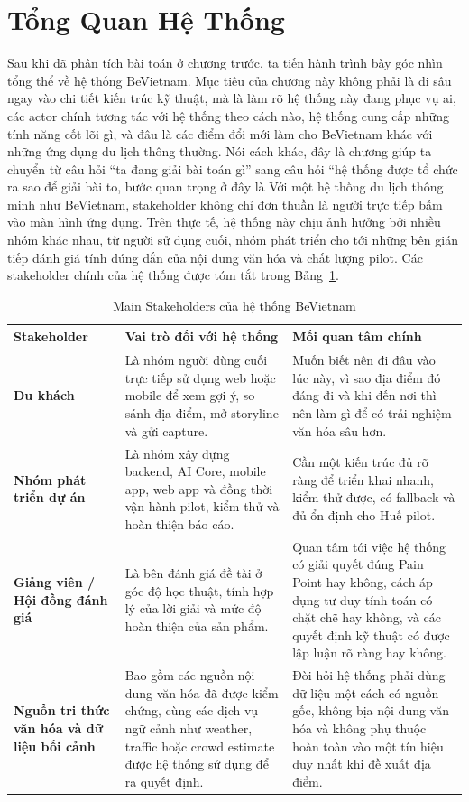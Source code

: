 \section{Tổng Quan Hệ Thống}

Sau khi đã phân tích bài toán ở
chương trước, ta tiến hành trình bày góc nhìn tổng thể về hệ thống
BeVietnam. Mục tiêu của chương này không phải là đi sâu ngay vào chi tiết
kiến trúc kỹ thuật, mà là làm rõ hệ thống này đang phục vụ ai, các actor
chính tương tác với hệ thống theo cách nào, hệ thống cung cấp những tính
năng cốt lõi gì, và đâu là các điểm đổi mới làm cho BeVietnam khác với
những ứng dụng du lịch thông thường. Nói cách khác, đây là chương giúp
ta chuyển từ câu hỏi ``ta đang giải bài toán gì'' sang câu hỏi ``hệ thống
được tổ chức ra sao để giải bài to, bước quan trọng ở đây là 
Với một hệ thống du lịch thông minh như BeVietnam, stakeholder không chỉ
đơn thuần là người trực tiếp bấm vào màn hình ứng dụng. Trên thực tế, hệ
thống này chịu ảnh hưởng bởi nhiều nhóm khác nhau, từ người sử dụng cuối,
nhóm phát triển cho tới những bên gián tiếp đánh giá tính đúng đắn của
nội dung văn hóa và chất lượng pilot. Các stakeholder chính của hệ thống
được tóm tắt trong Bảng~\ref{tab:main_stakeholders}.

\begin{table}[H]
\centering
\caption{Main Stakeholders của hệ thống BeVietnam}
\label{tab:main_stakeholders}
\begin{tabularx}{\textwidth}{>{\raggedright\arraybackslash}p{3.1cm} X X}
\toprule
\textbf{Stakeholder} & \textbf{Vai trò đối với hệ thống} & \textbf{Mối quan tâm chính} \\
\midrule
\textbf{Du khách} & Là nhóm người dùng cuối trực tiếp sử dụng web hoặc mobile để xem gợi ý, so sánh địa điểm, mở storyline và gửi capture. & Muốn biết nên đi đâu vào lúc này, vì sao địa điểm đó đáng đi và khi đến nơi thì nên làm gì để có trải nghiệm văn hóa sâu hơn. \\
\textbf{Nhóm phát triển dự án} & Là nhóm xây dựng backend, AI Core, mobile app, web app và đồng thời vận hành pilot, kiểm thử và hoàn thiện báo cáo. & Cần một kiến trúc đủ rõ ràng để triển khai nhanh, kiểm thử được, có fallback và đủ ổn định cho Huế pilot. \\
\textbf{Giảng viên / Hội đồng đánh giá} & Là bên đánh giá đề tài ở góc độ học thuật, tính hợp lý của lời giải và mức độ hoàn thiện của sản phẩm. & Quan tâm tới việc hệ thống có giải quyết đúng Pain Point hay không, cách áp dụng tư duy tính toán có chặt chẽ hay không, và các quyết định kỹ thuật có được lập luận rõ ràng hay không. \\
\textbf{Nguồn tri thức văn hóa và dữ liệu bối cảnh} & Bao gồm các nguồn nội dung văn hóa đã được kiểm chứng, cùng các dịch vụ ngữ cảnh như weather, traffic hoặc crowd estimate được hệ thống sử dụng để ra quyết định. & Đòi hỏi hệ thống phải dùng dữ liệu một cách có nguồn gốc, không bịa nội dung văn hóa và không phụ thuộc hoàn toàn vào một tín hiệu duy nhất khi đề xuất địa điểm. \\
\bottomrule
\end{tabularx}
\end{table}

